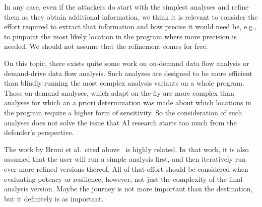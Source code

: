 In any case, even if the attackers do start with the simplest analyses and refine them as they obtain additional information, we think it is relevant to consider the effort required to extract that information and how precise it would need be, e.g., to pinpoint the most likely location in the program where more precision is needed. We should not assume that the refinement comes for free.

On this topic, there exists quite some work on on-demand data flow analysis or demand-drive data flow analysis. Such analyses are designed to be more efficient than blindly running the most complex analysis variants on a whole program. Those on-demand analyses, which adapt on-the-fly are more complex than analyses for which an a priori determination was made about which locations in the program require a higher form of sensitivity. So the consideration of such analyses does not solve the issue that AI research starts too much from the defender's perspective. 

The work by Bruni et al.\ cited above~\cite{bruni2022repair} is highly related. In that work, it is also assumed that the user will run a simple analysis first, and then iteratively run ever more refined versions thereof. All of that effort should be considered when evaluating potency or resilience, however, not just the complexity of the final analysis version. Maybe the journey is not more important than the destination, but it definitely is as important.

